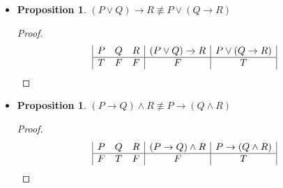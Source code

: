 \documentclass{article}
\newtheorem{prop}[thm]{Proposition}
\begin{document}
\begin{enumerate}[label={(\arabic*)}]
\begin{itemize}
\begin{proof}

    \end{proof}

    \item 
    \begin{prop}
        $(P \vee Q) \rightarrow R \not\equiv P \vee (Q \rightarrow R)$
    \end{prop}
    \begin{proof}
        \begin{displaymath}
            \begin{array}{|c c c|c|c|}
                P & Q & R & (P \vee Q) \rightarrow R & P \vee (Q \rightarrow R) \\
                \hline
                T & F & F & F & T
            \end{array}
        \end{displaymath}
    \end{proof}
    
    \item 
    \begin{prop}
        $(P \rightarrow Q) \wedge R \not\equiv P \rightarrow (Q \wedge R)$
    \end{prop}
    \begin{proof}
        \begin{displaymath}
            \begin{array}{|c c c|c|c|}
                P & Q & R & (P \rightarrow Q) \wedge R & P \rightarrow (Q \wedge R) \\
                \hline
                F & T & F & F & T
            \end{array}
        \end{displaymath}
    \end{proof}
    

\end{itemize}
\end{enumerate}
\end{document}

